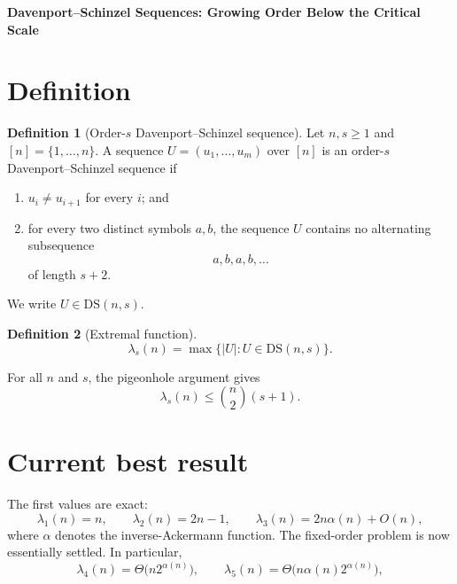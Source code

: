 \documentclass[11pt,a4paper]{article}
\theoremstyle{definition}
\newtheorem{definition}{Definition}
\begin{document}
\begin{center}
  {\Large\bfseries Davenport--Schinzel Sequences: Growing Order Below the Critical Scale}
\end{center}


\section{Definition}
\begin{definition}[Order-$s$ Davenport--Schinzel sequence]
Let $n,s\geq 1$ and $[n]=\{1,\ldots,n\}$. A sequence
$U=(u_1,\ldots,u_m)$ over $[n]$ is an order-$s$ Davenport--Schinzel sequence if
\begin{enumerate}
  \item $u_i\neq u_{i+1}$ for every $i$; and
  \item for every two distinct symbols $a,b$, the sequence $U$ contains no
  alternating subsequence
  \[
    a,b,a,b,\ldots
  \]
  of length $s+2$.
\end{enumerate}
We write $U\in\mathrm{DS}(n,s)$.
\end{definition}

\begin{definition}[Extremal function]
\begin{equation}
  \lambda_s(n)
  =\max\bigl\{|U|:U\in\mathrm{DS}(n,s)\bigr\}.
\end{equation}
\end{definition}

For all $n$ and $s$, the pigeonhole argument gives
\begin{equation}
  \lambda_s(n)\leq\binom{n}{2}(s+1).
\end{equation}

\section{Current best result}
The first values are exact:
\begin{equation}\label{eq:small-orders}
 \lambda_1(n)=n,\qquad \lambda_2(n)=2n-1,\qquad
 \lambda_3(n)=2n\alpha(n)+O(n),
\end{equation}
where $\alpha$ denotes the inverse-Ackermann function.  The fixed-order problem is
now essentially settled.  In particular,
\begin{equation}\label{eq:fixed-order}
 \lambda_4(n)=\Theta\!\bigl(n2^{\alpha(n)}\bigr),\qquad
 \lambda_5(n)=\Theta\!\bigl(n\alpha(n)2^{\alpha(n)}\bigr),
\end{equation}
\end{document}
